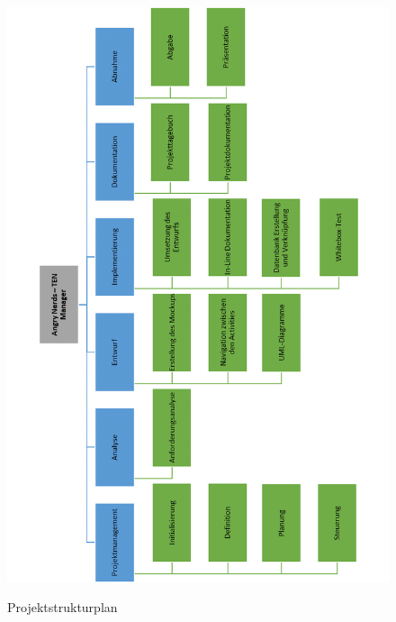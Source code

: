 \begin{figure}[H]
\centering
\begin{minipage}[t]{1\textwidth} %
\caption{Projektstrukturplan} %
\includegraphics[width=13cm]{img/Projektstrukturplan}\\ %
\end{minipage}
\end{figure}

